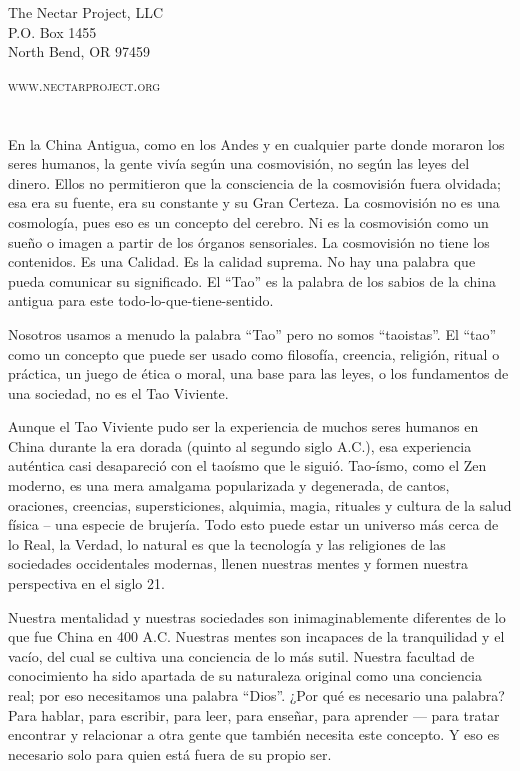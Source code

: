 \documentclass[book,b5paper,hidelinks,final]{memoir}
\begin{document}
		\par The Nectar Project, LLC\\
		P.O. Box 1455\\
		North Bend, OR 97459
		
		
		\par \textsc{www.nectarproject.org}
		
			
\mainmatter				
	
	\chapter*{}
	
	En la China Antigua, como en los Andes y en cualquier parte donde
	moraron los seres humanos, la gente vivía según una cosmovisión, no
	según las leyes del dinero. Ellos no permitieron que la consciencia de
	la cosmovisión fuera olvidada; esa era su fuente, era su constante y su
	Gran Certeza. La cosmovisión no es una cosmología, pues eso es un
	concepto del cerebro. Ni es la cosmovisión como un sueño o imagen a
	partir de los órganos sensoriales. La cosmovisión no tiene los
	contenidos. Es una Calidad. Es la calidad suprema. No hay una palabra
	que pueda comunicar su significado. El ``Tao'' es la palabra de los
	sabios de la china antigua para este todo-lo-que-tiene-sentido.
	
	Nosotros usamos a menudo la palabra ``Tao'' pero no somos ``taoistas''. El
	``tao'' como un concepto que puede ser usado como filosofía, creencia,
	religión, ritual o práctica, un juego de ética o moral, una base para
	las leyes, o los fundamentos de una sociedad, no es el Tao Viviente.
	
	Aunque el Tao Viviente pudo ser la experiencia de muchos seres humanos
	en China durante la era dorada (quinto al segundo siglo A.C.), esa
	experiencia auténtica casi desapareció con el taoísmo que le siguió.
	Tao-ísmo, como el Zen moderno, es una mera amalgama popularizada y
	degenerada, de cantos, oraciones, creencias, supersticiones, alquimia,
	magia, rituales y cultura de la salud física -- una especie de brujería.
	Todo esto puede estar un universo más cerca de lo Real, la Verdad, lo
	natural es que la tecnología y las religiones de las sociedades
	occidentales modernas, llenen nuestras mentes y formen nuestra
	perspectiva en el siglo 21.
	
	Nuestra mentalidad y nuestras sociedades son inimaginablemente
	diferentes de lo que fue China en 400 A.C. Nuestras mentes son incapaces
	de la tranquilidad y el vacío, del cual se cultiva una conciencia de lo
	más sutil. Nuestra facultad de conocimiento ha sido apartada de su
	naturaleza original como una conciencia real; por eso necesitamos una
	palabra ``Dios''. ¿Por qué es necesario una palabra? Para hablar, para
	escribir, para leer, para enseñar, para aprender --- para tratar
	encontrar y relacionar a otra gente que también necesita este concepto.
	Y eso es necesario solo para quien está fuera de su propio ser.
	
\end{document}
